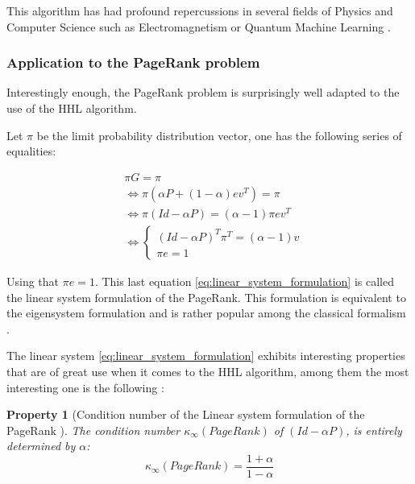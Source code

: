 \documentclass{article}
\newtheorem{propriete}{Property}[section]
\begin{document}
This algorithm has had profound repercussions in several fields of Physics and Computer Science such as Electromagnetism \cite{Clader_2013} or Quantum Machine Learning \cite{Zhao_2019}.

\subsubsection{Application to the PageRank problem}
Interestingly enough, the PageRank problem is surprisingly well adapted to the use of the HHL algorithm. 

Let $\pi$ be the limit probability distribution vector, one has the following series of equalities:

\begin{align}
    &\pi G = \pi \\
    &\Leftrightarrow \pi (\alpha P + (1-\alpha) ev^T) = \pi \\
    &\Leftrightarrow \pi (Id - \alpha P) = (\alpha - 1) \pi e v^T \\
    &\Leftrightarrow \left\{ \begin{array}{c}
        (Id - \alpha P)^T \pi^T = (\alpha - 1) v \\
           \pi e = 1
    \end{array} \label{eq:linear_system_formulation} \right.
\end{align}

Using that $\pi e = 1$. This last equation \ref{eq:linear_system_formulation} is called the linear system formulation of the PageRank. This formulation is equivalent to the eigensystem formulation and is rather popular among the classical formalism \cite{langville_meyer_2004, gleich_2015}.

The linear system \ref{eq:linear_system_formulation} exhibits interesting properties that are of great use when it comes to the HHL algorithm, among them the most interesting one is the following :

\begin{propriete}[Condition number of the Linear system formulation of the PageRank \cite{langville_meyer_2004}]
    The condition number $\kappa_\infty(PageRank)$ of $(Id - \alpha P)$, is entirely determined by $\alpha$:
    \begin{equation}
        \kappa_\infty(PageRank) = \frac{1+\alpha}{1-\alpha}
    \end{equation}
    
\end{propriete}
\end{document}
